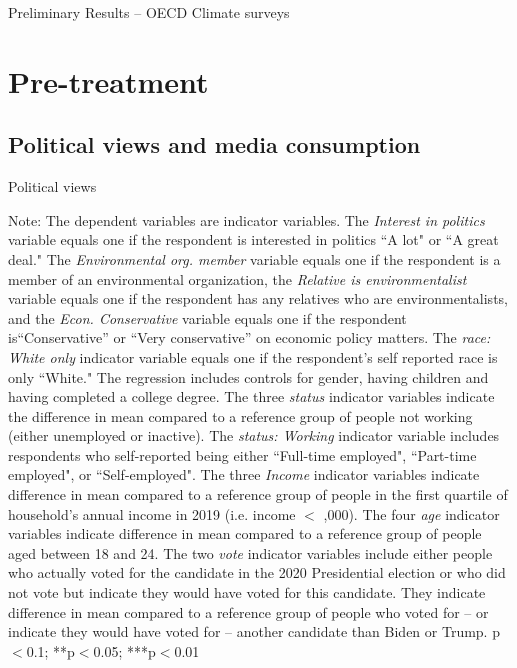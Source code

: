 \documentclass{article}
\begin{document}
\begin{LARGE}
	\begin{center}
		Preliminary Results – OECD Climate surveys	
	\end{center}
	
\end{LARGE}
	\tableofcontents
	\listoftables


\clearpage
\section{Pre-treatment}
\subsection{Political views and media consumption}


\begin{table}[h!]
	\caption{Political views}  \label{table polviews}
	\begin{center}
		\scalebox{0.7}{}
	\end{center}
	{\footnotesize Note: The dependent variables are indicator variables. The \textit{Interest in politics} variable equals one if the respondent is interested in politics ``A lot" or ``A great deal." The \textit{Environmental org. member} variable equals one if the respondent is a member of an environmental organization, the \textit{Relative is environmentalist} variable equals one if the respondent has any relatives who are environmentalists, and the \textit{Econ. Conservative} variable equals one if the respondent is``Conservative'' or ``Very conservative'' on economic policy matters.
	The \textit{race: White only} indicator variable equals one if the respondent's self reported race is only ``White." The regression includes controls for gender, having children and having completed a college degree. The three \textit{status} indicator variables indicate the difference in mean compared to a reference group of people not working (either unemployed or inactive). The \textit{status: Working} indicator variable includes respondents who self-reported being either ``Full-time employed", ``Part-time employed", or ``Self-employed". The three \textit{Income} indicator variables indicate difference in mean compared to a reference group of people in the first quartile of household's annual income in 2019 (i.e. income $<$ ,000). The four \textit{age} indicator variables indicate difference in mean compared to a reference group of people aged between 18 and 24. The two \textit{vote} indicator variables include either people who actually voted for the candidate in the 2020 Presidential election or who did not vote but indicate they would have voted for this candidate. They indicate difference in mean compared to a reference group of people who voted for -- or indicate they would have voted for -- another candidate than Biden or Trump.
	\newline  *p$<$0.1; **p$<$0.05; ***p$<$0.01}
\end{table}	
\end{document}
